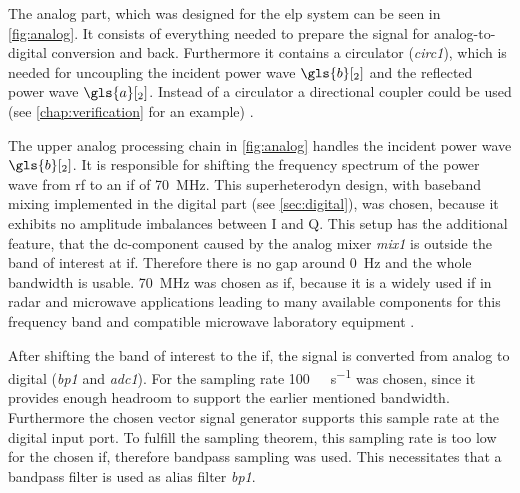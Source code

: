 \documentclass[12pt,a4paper,parskip=full,abstract=true,BCOR=12mm,twoside,open=right]{scrreprt}
\def\device#1{\textit{#1}}
\begin{document}
The analog part, which was designed for the \gls{elp} system can be seen in
\cref{fig:analog}. It consists of everything needed to prepare the signal
for analog-to-digital conversion and back. Furthermore it contains a
circulator (\device{circ1}), which is needed for uncoupling the
incident power wave $\gls{b}[_2]$ and the reflected power wave $\gls{a}[_2]$. Instead of a
circulator a directional coupler could be used (see
\cref{chap:verification} for an example) \cite{ghannouchi_load-pull_2013}.

The upper analog processing chain in \cref{fig:analog} handles the
incident power wave $\gls{b}[_2]$. It is responsible for shifting the frequency spectrum
of the power wave from \gls{rf} to an \gls{if} of \SI{70}{\mega\hertz}. This
superheterodyn design, with baseband mixing implemented in the digital
part (see \cref{sec:digital}), was chosen, because it exhibits no amplitude
imbalances between I and Q. This setup has the additional feature, that
the \gls{dc}-component caused by the analog mixer \device{mix1} is outside the
band of interest at \gls{if}. Therefore there is no gap around \SI{0}{\hertz}
and the whole bandwidth is usable. \SI{70}{\mega\hertz} was chosen as \gls{if},
because it is a widely used \gls{if} in radar and microwave applications
\cite{tozer_broadcast_2004,ahamed_design_1997,whitaker_rf_2002,penttinen_telecommunications_2015}
leading to many available components for this frequency band and compatible microwave
laboratory equipment \cite{agilent_h70}.

After shifting the band of interest to the \gls{if}, the signal is converted from
analog to digital (\device{bp1} and \device{adc1}). For the sampling rate
\SI{100}{\mega\samples\per\second} was chosen, since it provides enough headroom to
support the earlier mentioned bandwidth. Furthermore the chosen vector signal generator supports this sample rate
at the digital input port. To fulfill the sampling theorem, this sampling rate is too low for the chosen
\gls{if}, therefore bandpass sampling was used. This necessitates that a bandpass
filter is used as alias filter \device{bp1}.
\end{document}
